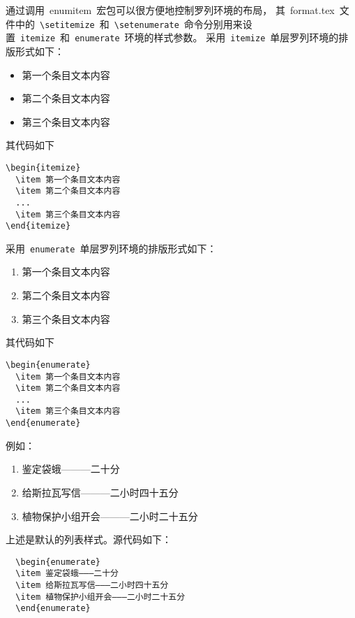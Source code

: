 通过调用~enumitem~宏包可以很方便地控制罗列环境的布局，
其~format.tex~文件中的~\verb|\setitemize|~和~\verb|\setenumerate|~命令分别用来设置~\verb|itemize|~和~\verb|enumerate|~环境的样式参数。
采用~\verb|itemize|~单层罗列环境的排版形式如下：

\begin{itemize}
  \item 第一个条目文本内容
  \item 第二个条目文本内容
  \item 第三个条目文本内容
\end{itemize}

其代码如下
\begin{verbatim}
\begin{itemize}
  \item 第一个条目文本内容
  \item 第二个条目文本内容
  ...
  \item 第三个条目文本内容
\end{itemize}
\end{verbatim}

采用~\verb|enumerate|~单层罗列环境的排版形式如下：
\begin{enumerate}
  \item 第一个条目文本内容
  \item 第二个条目文本内容
  \item 第三个条目文本内容
\end{enumerate}

其代码如下
\begin{verbatim}
\begin{enumerate}
  \item 第一个条目文本内容
  \item 第二个条目文本内容
  ...
  \item 第三个条目文本内容
\end{enumerate}
\end{verbatim}

例如：

\begin{enumerate}
  \item 鉴定袋蛾———二十分
  \item 给斯拉瓦写信———二小时四十五分
  \item 植物保护小组开会———二小时二十五分
\end{enumerate}

上述是默认的列表样式。源代码如下：
\begin{lstlisting}
  \begin{enumerate}
  \item 鉴定袋蛾———二十分
  \item 给斯拉瓦写信———二小时四十五分
  \item 植物保护小组开会———二小时二十五分
  \end{enumerate}
\end{lstlisting}

